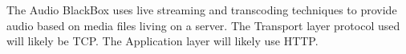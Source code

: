 The Audio BlackBox uses live streaming and transcoding techniques to provide audio based on media files living on a server. The Transport layer protocol used will likely be TCP. The Application layer will likely use HTTP.